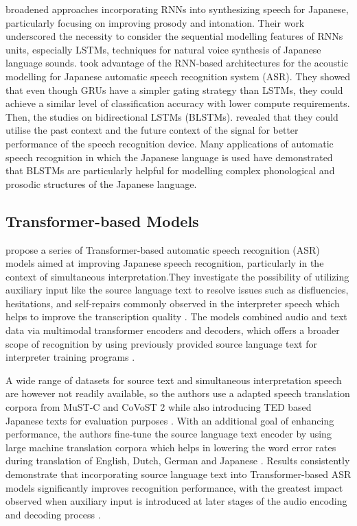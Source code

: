 \textcite{Kubo2014DeepLearning} broadened approaches incorporating RNNs into synthesizing speech for Japanese, particularly focusing on improving prosody and intonation. Their work underscored the necessity to consider the sequential modelling features of RNNs units, especially LSTMs, techniques for natural voice synthesis of Japanese language sounds. \textcite{takeuchi2020real} took advantage of the RNN-based architectures for the acoustic modelling for Japanese automatic speech recognition system (ASR). They showed that even though GRUs have a simpler gating strategy than LSTMs, they could achieve a similar level of classification accuracy with lower compute requirements. Then, the studies on bidirectional LSTMs (BLSTMs). \textcite{imaizumi2022} revealed that they could utilise the past context and the future context of the signal for better performance of the speech recognition device. Many applications of automatic speech recognition in which the Japanese language is used have demonstrated that BLSTMs are particularly helpful for modelling complex phonological and prosodic structures of the Japanese language.


\subsection{Transformer-based Models}
\textcite{taniguchi2022transformer} propose a series of Transformer-based automatic speech recognition (ASR) models aimed at improving Japanese speech recognition, particularly in the context of simultaneous interpretation.They investigate the possibility of utilizing auxiliary input like the source language text to resolve issues such as disfluencies, hesitations, and self-repairs commonly observed in the interpreter speech which helps to improve the transcription quality \parencite{Futami2020Bidirectional}. The models combined audio and text data via multimodal transformer encoders and decoders, which offers a broader scope of recognition by using previously provided source language text for interpreter training programs \parencite{taniguchi2022transformer}.

A wide range of datasets for source text and simultaneous interpretation speech are however not readily available, so the authors use a adapted speech translation corpora from MuST-C and CoVoST 2 while also introducing TED based Japanese texts for evaluation purposes \parencite{taniguchi2022transformer}. With an additional goal of enhancing performance, the authors fine-tune the source language text encoder by using large machine translation corpora which helps in lowering the word error rates during translation of English, Dutch, German and Japanese  \parencite{Taniguchi2024Pretraining}. Results consistently demonstrate that incorporating source language text into Transformer-based ASR models significantly improves recognition performance, with the greatest impact observed when auxiliary input is introduced at later stages of the audio encoding and decoding process \parencite{Futami2020Bidirectional}.

